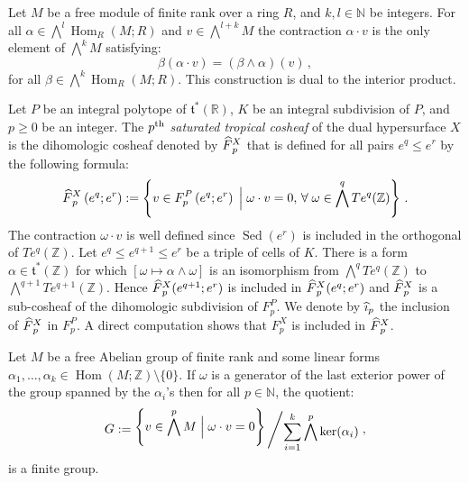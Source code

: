 \documentclass[AHL,Unicode,longabstracts,published]{cedram}
\newcommand{\bigslant}[2]{{\raisebox{.2em}{$#1$}\left/\raisebox{-.2em}{$#2$}\right.}}
\newcommand{\R}{\mathbb{R}}
\newcommand{\Z}{\mathbb{Z}}
\newcommand{\N}{\mathbb{N}}
\renewcommand{\t}{\mathfrak{t}}
\DeclareMathOperator{\Sed}{Sed}
\DeclareMathOperator{\Hom}{Hom}
\newcommand{\Fbar}{\hat{F}}
\newcommand{\ibar}{\hat{\imath}}
\let\oldhat\hat
\renewcommand*{\hat}[1]{\mathchoice{\widehat{#1}}{\widehat{#1}}{\oldhat{#1}}{\oldhat{#1}}}
\let\oldforall\forall
\renewcommand*{\forall}{\mathrel{\oldforall}}
\begin{document}
\begin{defi}[Contraction]\label{definition:contraction}
Let $M$ be a free module of finite rank over a ring $R$, and $k,l\in\N$ be integers. For all $\alpha\in \bigwedge^l \Hom_R(M;R)$ and $v\in\bigwedge^{l+k}M$ the contraction $\alpha\cdot v$ is the only element of $\bigwedge^{k} M$ satisfying:
\begin{equation*}
\beta(\alpha\cdot v)=(\beta\wedge\alpha)(v)\,,
\end{equation*}
for all $\beta\in \bigwedge^k\Hom_R(M;R)$. This construction is dual to the interior product.
\end{defi}

\begin{defi}\label{definition:saturated_co_sheaves}
Let $P$ be an integral polytope of $\t^*(\R)$, $K$ be an integral subdivision of $P$, and $p\geq 0$ be an integer. The \emph{$p^{\rm th}$ saturated tropical cosheaf} of the dual hypersurface $X$ is the dihomologic cosheaf denoted by $\Fbar^X_p$ that is defined for all pairs $e^q \leq e^{r}$ by the following formula:
\begin{equation*}
\Fbar^X_p\left(e^q ;e^{r}\right):= \left\{ v\in F^P_p\left(e^q ;e^{r}\right)\;\Big|\; \omega\cdot v =0,\,\forall \omega \in \bigwedge^qTe^q(\Z)\right\}\,.
\end{equation*}
The contraction $\omega\cdot v$ is well defined since $\Sed\left(e^{r}\right)$ is included in the orthogonal of $Te^q(\Z)$. Let $e^{q}\leq e^{q+1}\leq e^{r}$ be a triple of cells of $K$. There is a form $\alpha\in\t^*(\Z)$ for which $[\omega\mapsto \alpha\wedge\omega]$ is an isomorphism from $\bigwedge^{q}Te^{q}(\Z)$ to $\bigwedge^{q+1}Te^{q+1}(\Z)$. Hence $\Fbar^X_p(e^{q+1};e^{r})$ is included in $\Fbar^X_p(e^{q};e^{r})$ and $\Fbar^X_p$ is a sub-cosheaf of the dihomologic subdivision of $F^P_p$. We denote by $\ibar_p$ the inclusion of $\Fbar^X_p$ in $F^P_p$. A direct computation shows that $F^X_p$ is included in $\Fbar^X_p$.
\end{defi}

\begin{lemm}\label{lemm:finite_index}
Let $M$ be a free Abelian group of finite rank and some linear forms $\alpha_1,\dots,\alpha_k\in\Hom(M;\Z)\setminus\{0\}$. If $\omega$ is a generator of the last exterior power of the group spanned by the $\alpha_i$'s then for all $p\in \N$, the quotient:
\begin{equation*}
G:= \bigslant{\displaystyle \left\{v\in\bigwedge^pM\;\Big|\;\omega\cdot v=0\right\}}{\displaystyle \sum_{i=1}^k\bigwedge^p\ker(\alpha_i)}\,,
\end{equation*}
\noindent is a finite group.
\end{lemm}
\end{document}
